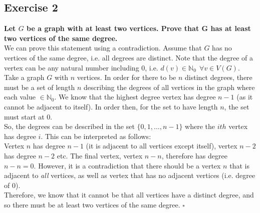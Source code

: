 \subsection*{Exercise 2}
\boldmath
\textbf{Let $G$ be a graph with at least two vertices. Prove that G has at least two vertices of the same degree.} \\
\linebreak 
\unboldmath
We can prove this statement using a contradiction. Assume that $G$ has no vertices of the same degree, i.e. all degrees are distinct. Note that the degree of a vertex can be any natural number including 0, i.e. $d(v) \in \mathbb{N}_0 \:\: \forall v \in V(G)$. \\
\linebreak 
Take a graph $G$ with $n$ vertices. In order for there to be $n$ distinct degrees, there must be a set of length $n$ describing the degrees of all vertices in the graph where each value $\in \mathbb{N}_0$. We know that the highest degree vertex has degree $n-1$ (as it cannot be adjacent to itself). In order then, for the set to have length $n$, the set must start at 0.  \\
\linebreak 
So, the degrees can be described in the set $\{0, 1, ..., n-1\}$ where the $ith$ vertex has degree $i$. This can be interpreted as follows: \\
\linebreak 
Vertex $n$ has degree $n-1$ (it is adjacent to all vertices except itself), vertex $n-2$ has degree $n-2$ etc.
The final vertex, vertex $n-n$, therefore has degree $n-n = 0$. However, it is a contradiction that there should be a vertex $n$ that is adjacent to \textit{all} vertices, as well as vertex that has no adjacent vertices (i.e. degree of 0). \\
\linebreak 
Therefore, we know that it cannot be that all vertices have a distinct degree, and so there must be at least two vertices of the same degree. \hspace*{10mm} $\square$\\

